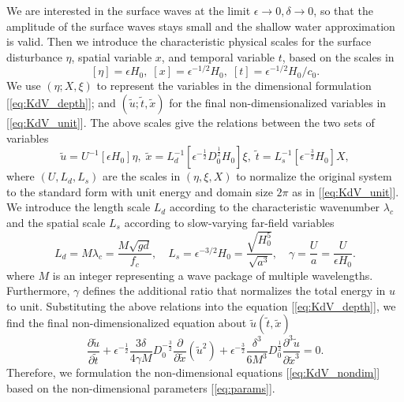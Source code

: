 \documentclass[9pt,twoside,lineno]{pnas-new}
\theoremstyle{plain}
\theoremstyle{plain}
\begin{document}
We are interested in the surface waves at the limit $\epsilon\rightarrow0,\delta\rightarrow0$,
so that the amplitude of the surface waves stays small and the shallow
water approximation is valid. Then we introduce the characteristic
physical scales for the surface disturbance $\eta$, spatial variable
$x$, and temporal variable $t$, based on the scales in \cite{johnson1997modern}
\[
\left[\eta\right]=\epsilon H_{0},\;\left[x\right]=\epsilon^{-1/2}H_{0},\;\left[t\right]=\epsilon^{-1/2}H_{0}/c_{0}.
\]
We use $\left(\eta;X,\xi\right)$ to represent the variables in the
dimensional formulation [\ref{eq:KdV_depth}]; and $\left(\tilde{u};\tilde{t},\tilde{x}\right)$
for the final non-dimensionalized variables in [\ref{eq:KdV_unit}].
The above scales give the relations between the two sets of variables
\[
\tilde{u}=U^{-1}\left[\epsilon H_{0}\right]\eta,\;\tilde{x}=L_{d}^{-1}\left[\epsilon^{-\frac{1}{2}}D_{0}^{\frac{1}{2}}H_{0}\right]\xi,\;\tilde{t}=L_{s}^{-1}\left[\epsilon^{-\frac{3}{2}}H_{0}\right]X,
\]
where $\left(U,L_{d},L_{s}\right)$ are the scales in $\left(\eta,\xi,X\right)$
to normalize the original system to the standard form with unit energy
and domain size $2\pi$ as in [\ref{eq:KdV_unit}]. We introduce the
length scale $L_{d}$ according to the characteristic wavenumber $\lambda_{c}$
and the spatial scale $L_{s}$ according to slow-varying far-field
variables
\begin{equation}
L_{d}=M\lambda_{c}=\frac{M\sqrt{gd}}{f_{c}},\quad L_{s}=\epsilon^{-3/2}H_{0}=\frac{\sqrt{H_{0}^{5}}}{\sqrt{a^{3}}},\quad\gamma=\frac{U}{a}=\frac{U}{\epsilon H_{0}}.\label{eq:meas_scales}
\end{equation}
where $M$ is an integer representing a wave package of multiple wavelengths.
Furthermore, $\gamma$ defines the additional ratio that normalizes
the total energy in $u$ to unit. Substituting the above relations
into the equation [\ref{eq:KdV_depth}], we find the final non-dimensionalized
equation about $\tilde{u}\left(\tilde{t},\tilde{x}\right)$
\begin{equation}
\frac{\partial\tilde{u}}{\partial\tilde{t}}+\epsilon^{-\frac{1}{2}}\frac{3\delta}{4\gamma M}D_{0}^{-\frac{3}{2}}\frac{\partial}{\partial\tilde{x}}\left(\tilde{u}^{2}\right)+\epsilon^{-\frac{3}{2}}\frac{\delta^{3}}{6M^{3}}D_{0}^{\frac{1}{2}}\frac{\partial^{3}\tilde{u}}{\partial\tilde{x}^{3}}=0.\label{eq:KdV_nondim}
\end{equation}
Therefore, we formulation the non-dimensional equations [\ref{eq:KdV_nondim}]
based on the non-dimensional parameters [\ref{eq:params}]. 
\end{document}
